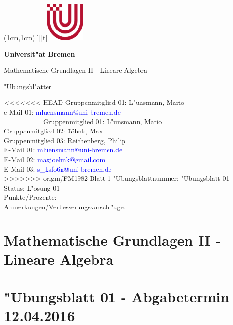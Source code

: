 \documentclass[12pt,a4paper]{article}
\newcommand\header{\textsf{\textbf{\Large \\}}}
\newcommand\headers{\textsf{\textbf{\Large \hspace{2.55cm} Universit"at Bremen}}}
\newcommand\headerf{\textsf{\large \hspace{2.6cm} Mathematische Grundlagen II - Lineare Algebra}}
\newcommand\headerg{\textsf{\large \hspace{2.6cm} "Ubungsbl"atter}}
\newcommand\FIG{\hspace{1.7cm}\includegraphics{Uni-Logo-new2.jpg}}
\begin{document}

\parpic(1cm,1cm)[l][t]{\FIG}
\header\par
\headers\par
\headerf\par
\headerg\par

\vspace{1.1cm}
\begin{flushleft}
\begin{tabbing}
<<<<<<< HEAD
Gruppenmitglied 01: \=L"unsmann, Mario\\[2ex]
e-Mail 01: \>\textcolor{blue}{mluensmann@uni-bremen.de}\\[2ex]
=======
Gruppenmitglied 01: \=L"unsmann, Mario\\[2ex]
Gruppenmitglied 02: \=Jöhnk, Max\\[2ex]
Gruppenmitglied 03: \=Reichenberg, Philip\\[2ex]
E-Mail 01: \>\textcolor{blue}{mluensmann@uni-bremen.de}\\[2ex]
E-Mail 02: \>\textcolor{blue}{maxjoehnk@gmail.com}\\[2ex]
E-Mail 03: \>\textcolor{blue}{s_ksfo6n@uni-bremen.de}\\[2ex]
>>>>>>> origin/FM1982-Blatt-1
"Ubungsblattnummer: \>"Ubungsblatt 01\\[2ex]
Status: \>L"osung 01\\[8ex]
Punkte/Prozente:\\[16ex]
Anmerkungen/Verbesserungsvorschl"age:
\end{tabbing}
\end{flushleft}

\clearpage

\section*{Mathematische Grundlagen II - Lineare Algebra}

\section*{"Ubungsblatt 01 - Abgabetermin 12.04.2016}
\end{document}
